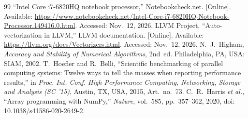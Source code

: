 \begin{thebibliography}{99}
 ``Intel Core i7-6820HQ notebook processor,'' Notebookcheck.net. [Online]. Available: \url{https://www.notebookcheck.net/Intel-Core-i7-6820HQ-Notebook-Processor.149416.0.html}. Accessed: Nov.~12, 2026.
 LLVM Project, ``Auto-vectorization in LLVM,'' LLVM documentation. [Online]. Available: \url{https://llvm.org/docs/Vectorizers.html}. Accessed: Nov.~12, 2026.
 N.~J.~Higham, \emph{Accuracy and Stability of Numerical Algorithms}, 2nd~ed. Philadelphia, PA, USA: SIAM, 2002.
 T.~Hoefler and R.~Belli, ``Scientific benchmarking of parallel computing systems: Twelve ways to tell the masses when reporting performance results,'' in \emph{Proc. Int. Conf. High Performance Computing, Networking, Storage and Analysis (SC '15)}, Austin, TX, USA, 2015, Art.~no.~73.
 C.~R.~Harris \emph{et al.}, ``Array programming with NumPy,'' \emph{Nature}, vol.~585, pp.~357--362, 2020, doi: 10.1038/s41586-020-2649-2.
\end{thebibliography}
